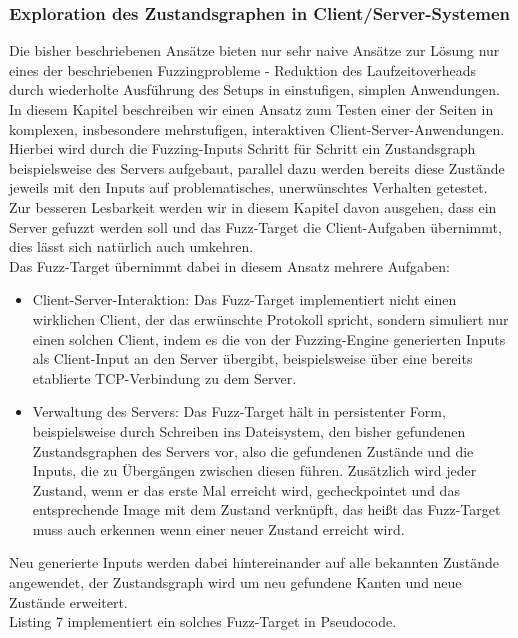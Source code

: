 \documentclass[a4paper]{article}
\begin{document}
\subsubsection{Exploration des Zustandsgraphen in Client/Server-Systemen}
Die bisher beschriebenen Ansätze bieten nur sehr naive Ansätze zur Lösung nur eines der beschriebenen Fuzzingprobleme - Reduktion des Laufzeitoverheads durch wiederholte Ausführung des Setups in einstufigen, simplen Anwendungen. 
In diesem Kapitel beschreiben wir einen Ansatz zum Testen einer der Seiten in komplexen, insbesondere mehrstufigen, interaktiven Client-Server-Anwendungen. 
Hierbei wird durch die Fuzzing-Inputs Schritt für Schritt ein Zustandsgraph beispielsweise des Servers aufgebaut, parallel dazu werden bereits diese Zustände jeweils mit den Inputs auf problematisches, unerwünschtes Verhalten getestet. 
Zur besseren Lesbarkeit werden wir in diesem Kapitel davon ausgehen, dass ein Server gefuzzt werden soll und das Fuzz-Target die Client-Aufgaben übernimmt, dies lässt sich natürlich auch umkehren.\\
Das Fuzz-Target übernimmt dabei in diesem Ansatz mehrere Aufgaben:
\begin{itemize}
    \item Client-Server-Interaktion: Das Fuzz-Target implementiert nicht einen wirklichen Client, der das erwünschte Protokoll spricht, sondern simuliert nur einen solchen Client, indem es die von der Fuzzing-Engine generierten Inputs als Client-Input an den Server übergibt, beispielsweise über eine bereits etablierte TCP-Verbindung zu dem Server.
    \item Verwaltung des Servers: Das Fuzz-Target hält in persistenter Form, beispielsweise durch Schreiben ins Dateisystem, den bisher gefundenen Zustandsgraphen des Servers vor, also die gefundenen Zustände und die Inputs, die zu Übergängen zwischen diesen führen. 
        Zusätzlich wird jeder Zustand, wenn er das erste Mal erreicht wird, gecheckpointet und das entsprechende Image mit dem Zustand verknüpft, das heißt das Fuzz-Target muss auch erkennen wenn einer neuer Zustand erreicht wird.
\end{itemize}
Neu generierte Inputs werden dabei hintereinander auf alle bekannten Zustände angewendet, der Zustandsgraph wird um neu gefundene Kanten und neue Zustände erweitert.\\
Listing 7 implementiert ein solches Fuzz-Target in Pseudocode.
\end{document}
